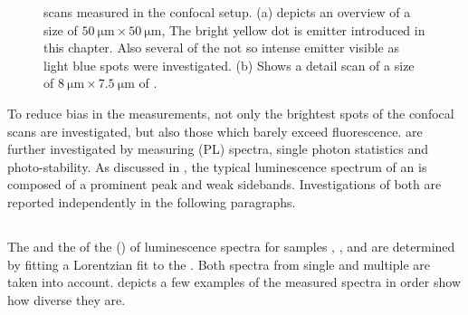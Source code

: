 \begin{figure}[htp]
\begin{subfigure}[t]{ 0.49\linewidth}
			\caption{}
			\label{subfig::scan_2}
		\end{subfigure}
		\caption[Confocal \pl scans.]{\Pl scans measured in the confocal setup. (a) depicts an overview of a size of $\SI{50}{\micro\meter}\times\SI{50}{\micro\meter}$, The bright yellow dot is emitter \embroad introduced in this chapter. Also several of the not so intense emitter visible as light blue spots were investigated. (b) Shows a detail scan of a size of $\SI{8}{\micro\meter}\times\SI{7.5}{\micro\meter}$ of \embroad.}
		\label{fig::scans}
	\end{figure}

	To reduce bias in the measurements, not only the brightest spots of the confocal scans are investigated, but also those which barely exceed \bkg fluorescence.
	\sivs are further investigated by measuring \pl (PL) spectra, single photon statistics and photo-stability.
	As discussed in , the typical luminescence spectrum of an \siv is composed of a prominent \zpl peak and weak sidebands.
	Investigations of both are reported independently in the following paragraphs.

\subsection{\Zpl}\label{subsec::zpl}

	The \cwl and the \lw of the \zpl (\ZPL) of \siv luminescence spectra for samples \insituF, \insituS, and \insituH are determined by fitting a Lorentzian fit to the \ZPL.
	Both spectra from single and multiple \sivs are taken into account.
	 depicts a few examples of the measured spectra in order show how diverse they are.

